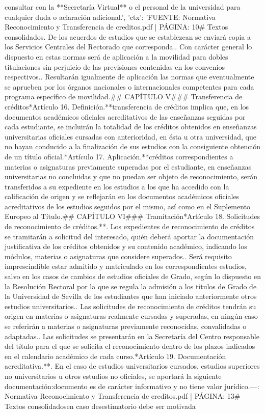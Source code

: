 \documentclass{article}
\begin{document}
\begin{itemize}
{{consultar con la **Secretaría Virtual** o el personal de la universidad para cualquier duda o aclaración adicional.', 'ctx': 'FUENTE: Normativa Reconocimiento y Transferencia de creditos.pdf | PÁGINA: 10\n# Textos consolidados\n{}. De los acuerdos de estudios que se establezcan se enviará copia a los Servicios Centrales del Rectorado que corresponda.. Con carácter general lo dispuesto en estas normas será de aplicación a la movilidad para dobles titulaciones sin perjuicio de las previsiones contenidas en los convenios respectivos.. Resultarán igualmente de aplicación las normas que eventualmente se aprueben por los órganos nacionales o internacionales competentes para cada programa específico de movilidad.\n\n## CAPÍTULO V\n### Transferencia de créditos\n**Artículo 16. Definición.**\nLa transferencia de créditos implica que, en los documentos académicos oficiales acreditativos de las enseñanzas seguidas por cada estudiante, se incluirán la totalidad de los créditos obtenidos en enseñanzas universitarias oficiales cursadas con anterioridad, en ésta u otra universidad, que no hayan conducido a la finalización de sus estudios con la consiguiente obtención de un título oficial.\n\n**Artículo 17. Aplicación.**\nLos créditos correspondientes a materias o asignaturas previamente superadas por el estudiante, en enseñanzas universitarias no concluidas y que no puedan ser objeto de reconocimiento, serán transferidos a su expediente en los estudios a los que ha accedido con la calificación de origen y se reflejarán en los documentos académicos oficiales acreditativos de los estudios seguidos por el mismo, así como en el Suplemento Europeo al Título.\n\n## CAPÍTULO VI\n### Tramitación\n**Artículo 18. Solicitudes de reconocimiento de créditos.**. Los expedientes de reconocimiento de créditos se tramitarán a solicitud del interesado, quién deberá aportar la documentación justificativa de los créditos obtenidos y su contenido académico, indicando los módulos, materias o asignaturas que considere superados.. Será requisito imprescindible estar admitido y matriculado en los correspondientes estudios, salvo en los casos de cambios de estudios oficiales de Grado, según lo dispuesto en la Resolución Rectoral por la que se regula la admisión a los títulos de Grado de la Universidad de Sevilla de los estudiantes que han iniciado anteriormente otros estudios universitarios.. Las solicitudes de reconocimiento de créditos tendrán su origen en materias o asignaturas realmente cursadas y superadas, en ningún caso se referirán a materias o asignaturas previamente reconocidas, convalidadas o adaptadas.. Las solicitudes se presentarán en la Secretaría del Centro responsable del título para el que se solicita el reconocimiento dentro de los plazos indicados en el calendario académico de cada curso.\n\n**Artículo 19. Documentación acreditativa.**. En el caso de estudios universitarios cursados, estudios superiores no universitarios u otros estudios no oficiales, se aportará la siguiente documentación:\n\nEste documento es de carácter informativo y no tiene valor jurídico.\n\n---\n\nFUENTE: Normativa Reconocimiento y Transferencia de creditos.pdf | PÁGINA: 13\n# Textos consolidados\n\nque en caso desestimatorio debe ser motivada }}
\end{itemize}
\end{document}
